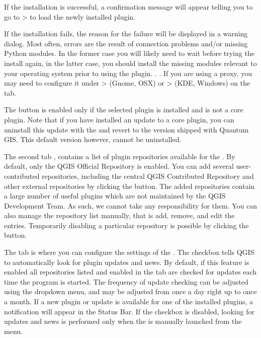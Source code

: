 If the installation is successful, a confirmation message will appear telling you to go to  >  to load the newly installed plugin.

If the installation fails, the reason for the failure will be displayed in a warning dialog. Most often, errors are the result of 
connection problems and/or missing Python modules. In the former case you will likely need to wait before trying the install again, in the latter case, you should install the missing modules relevant to your operating system prior to using the plugin. . . If you are using a proxy, you may need to configure it under  >  (Gnome, OSX) 
or  >  (KDE, Windows) on the  tab.

The  button is enabled only if the selected plugin is installed and is not a core plugin. Note that if you have installed an update to a core plugin, you can uninstall this update with the  and revert to the version shipped with Quantum GIS. This default version however, cannot be uninstalled.


The second tab , contains a list of plugin repositories available for the . By default, only the QGIS Official Repository is enabled. You can add several user-contributed repositories, including the central QGIS Contributed Repository and other external repositories by clicking the  button. The added repositories contain a large number of useful plugins which are not maintained by the QGIS Development Team. As such, we cannot take any responsibility for them. You can also manage the repository list manually, that is add, remove, and edit the entries. Temporarily disabling a particular repository is possible by clicking the  button.


The  tab is where you can configure the settings of the . The  checkbox tells QGIS to automatically look for plugin updates and news. By default, if this feature is enabled all repositories listed and enabled in the  tab are checked for updates each time the program is started. The frequency of update checking can be adjusted using the dropdown menu, and may be adjusted from once a day right up to once a month. If a new plugin or update is available for one of the installed plugins, a notification will appear in the Status Bar. If the checkbox is disabled, looking for updates and news is performed only when the  is manually launched from the menu.

